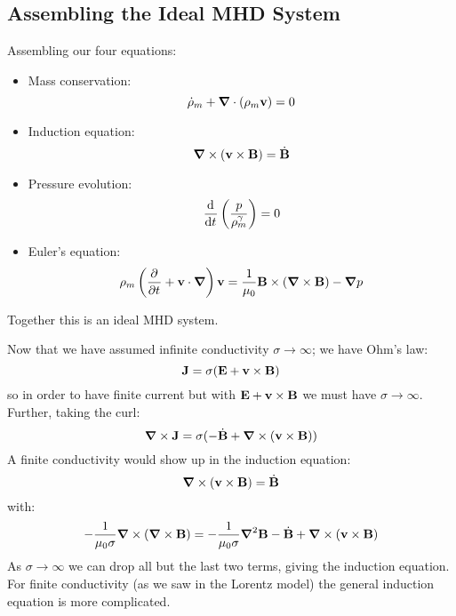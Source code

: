 \subsection{Assembling the Ideal MHD System}
Assembling our four equations:
\begin{itemize}
    \item Mass conservation:
    \begin{equation}
         \dot{\rho}_m + \nabla \cdot (\rho_m\v{v}) = 0
    \end{equation}
    \item Induction equation:
    \begin{equation}
        \nabla \times (\v{v} \times \v{B}) = \dot{\v{B}}
    \end{equation}
    \item Pressure evolution:
    \begin{equation}
        \dod{}{t}\left(\frac{p}{\rho^\gamma_m}\right) = 0
    \end{equation}
    \item Euler's equation:
    \begin{equation}
    \rho_m\left(\dpd{}{t} + \v{v} \cdot \nabla\right)\v{v}  =\frac{1}{\mu_0}\v{B} \times (\nabla \times \v{B}) - \nabla p
\end{equation}
\end{itemize}
Together this is an ideal MHD system.

Now that we have assumed infinite conductivity $\sigma \to \infty$; we have Ohm's law:
\begin{equation}
    \mathbf{J} = \sigma(\mathbf{E} + \mathbf{v} \times \mathbf{B})
\end{equation}
so in order to have finite current but with $\mathbf{E} + \mathbf{v} \times \mathbf{B}$ we must have $\sigma \to \infty$. Further, taking the curl:
\begin{equation}
    \nabla \times \v{J} = \sigma(-\dot{\v{B}} + \nabla \times (\v{v} \times \v{B}))
\end{equation}
A finite conductivity would show up in the induction equation:
\begin{equation}
    \nabla \times (\v{v} \times \v{B}) = \dot{\v{B}}
\end{equation}
with:
\begin{equation}
    -\frac{1}{\mu_0\sigma}\nabla \times (\nabla \times \v{B}) = -\frac{1}{\mu_0 \sigma}\nabla^2 \v{B} - \dot{\v{B}} + \nabla \times (\v{v} \times \v{B})
\end{equation}
As $\sigma \to \infty$ we can drop all but the last two terms, giving the induction equation. For finite conductivity (as we saw in the Lorentz model) the general induction equation is more complicated.